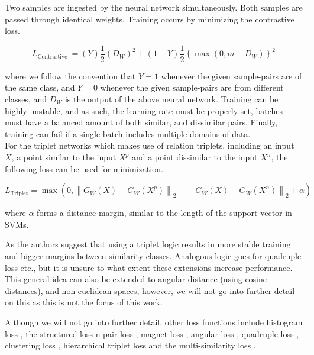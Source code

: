 \documentclass[a4paper,12pt,oneside,openright]{report}
\begin{document}
\quad

Two samples are ingested by the neural network simultaneously.
Both samples are passed through identical weights.
Training occurs by minimizing the contrastive loss.

\begin{equation}
L_{\text {Contrastive }}=(Y) \frac{1}{2}\left(D_{W}\right)^{2}+(1-Y) \frac{1}{2}\left\{\max \left(0, m-D_{W}\right)\right\}^{2}
\end{equation}

where we follow the convention that $Y=1$ whenever the given sample-pairs are of the same class, and $Y=0$ whenever the given sample-pairs are from different classes, and $D_W$ is the output of the above neural network.
Training can be highly unstable, and as such, the learning rate must be properly set, batches must have a balanced amount of both similar, and dissimilar pairs. 
Finally, training can fail if a single batch includes multiple domains of data. \\

For the triplet networks \cite{hoffer14} which makes use of relation triplets, including an input $X$, a point similar to the input $X^p$ and a point dissimilar to the input $X^n$, the following loss can be used for minimization.

\begin{equation}
L_{\text {Triplet}}=\max \left(0,\left\|G_{W}(X)-G_{W}\left(X^{p}\right)\right\|_{2}-\left\|G_{W}(X)-G_{W}\left(X^{n}\right)\right\|_{2}+\alpha\right)
\end{equation} 

where $\alpha$ forms a distance margin, similar to the length of the support vector in SVMs.

As the authors suggest that using a triplet logic results in more stable training and bigger margins between similarity classes.
Analogous logic goes for quadruple loss etc., but it is unsure to what extent these extensions increase performance.
This general idea can also be extended to angular distance (using cosine distances), and non-euclidean spaces, however, we will not go into further detail on this as this is not the focus of this work.

Although we will not go into further detail, other loss functions include histogram loss \cite{ustinova16}, the structured loss \cite{song16} n-pair loss \cite{sohn16}, magnet loss \cite{rippel16}, angular loss \cite{wang17}, quadruple loss \cite{ni17}, clustering loss \cite{song17}, hierarchical triplet loss \cite{ge18} and the multi-similarity loss \cite{wang19c}.
\end{document}
